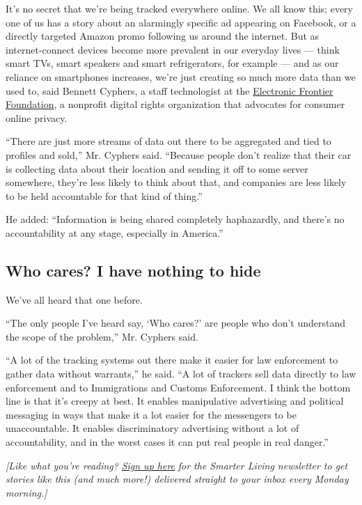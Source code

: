 It's no secret that we're being tracked everywhere online. We all know
this; every one of us has a story about an alarmingly specific ad
appearing on Facebook, or a directly targeted Amazon promo following us
around the internet. But as internet-connect devices become more
prevalent in our everyday lives --- think smart TVs, smart speakers and
smart refrigerators, for example --- and as our reliance on smartphones
increases, we're just creating so much more data than we used to, said
Bennett Cyphers, a staff technologist at the
\href{https://www.eff.org/}{Electronic Frontier Foundation}, a nonprofit
digital rights organization that advocates for consumer online privacy.

``There are just more streams of data out there to be aggregated and
tied to profiles and sold,'' Mr. Cyphers said. ``Because people don't
realize that their car is collecting data about their location and
sending it off to some server somewhere, they're less likely to think
about that, and companies are less likely to be held accountable for
that kind of thing.''

He added: ``Information is being shared completely haphazardly, and
there's no accountability at any stage, especially in America.''

\hypertarget{who-cares-i-have-nothing-to-hide}{%
\subsection{Who cares? I have nothing to
hide}\label{who-cares-i-have-nothing-to-hide}}

We've all heard that one before.

``The only people I've heard say, `Who cares?' are people who don't
understand the scope of the problem,'' Mr. Cyphers said.

``A lot of the tracking systems out there make it easier for law
enforcement to gather data without warrants,'' he said. ``A lot of
trackers sell data directly to law enforcement and to Immigrations and
Customs Enforcement. I think the bottom line is that it's creepy at
best. It enables manipulative advertising and political messaging in
ways that make it a lot easier for the messengers to be unaccountable.
It enables discriminatory advertising without a lot of accountability,
and in the worst cases it can put real people in real danger.''

\emph{{[}Like what you're reading?}
\href{https://www.nytimes.com/newsletters/smarter-living?module=inline}{\emph{Sign
up here}} \emph{for the Smarter Living newsletter to get stories like
this (and much more!) delivered straight to your inbox every Monday
morning.{]}}

